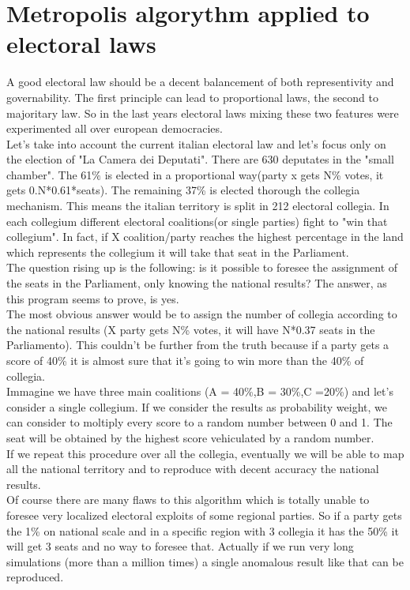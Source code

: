 \documentclass[12pt,a4paper,openright]{report}
\begin{document}
\chapter*{Metropolis algorythm applied to electoral laws}
A good electoral law should be a decent balancement of both representivity and governability. The first principle  can lead to proportional laws, the second to majoritary law. So in the last years electoral laws mixing these two features were experimented all over european democracies.\\
Let's take into account the current italian electoral law and let's focus only on the election of "La Camera dei Deputati". There are 630 deputates in the "small chamber". The 61$\% $ is elected in a proportional way(party x gets N\% votes, it gets 0.N*0.61*seats). The remaining 37\% is elected thorough the collegia mechanism. This means the italian territory is split in 212 electoral collegia. In each collegium different electoral coalitions(or single parties) fight to "win that collegium". In fact, if X coalition/party reaches the highest percentage in the land which represents the collegium it will take that seat in the Parliament.\\
The question rising up is the following: is it possible to foresee the assignment of the seats in the Parliament, only knowing the national results? The answer, as this program seems to prove, is yes.\\
The most obvious answer would be to assign the number of collegia according to the national results (X party gets N\% votes, it will have N*0.37 seats in the Parliamento). This couldn't be further from the truth because if a party gets a score of 40\% it is almost sure that it's going to win more than the 40\% of collegia.\\
Immagine we have three main coalitions (A = 40\%,B = 30\%,C =20\%) and let's consider a single collegium. If we consider the results as probability weight, we can consider to moltiply every score to a random number between 0 and 1. The seat will be obtained by the highest score vehiculated by a random number.\\
If we repeat this procedure over all the collegia, eventually we will be able to map all the national territory and to reproduce with decent accuracy the national results.\\
Of course there are many flaws to this algorithm which is totally unable to foresee very localized electoral exploits of some regional parties. So if a party gets the 1\% on national scale and in a specific region with 3 collegia it has the 50\% it will get 3 seats and no way to foresee that. Actually if we run very long simulations (more than a million times) a single anomalous result like that can be reproduced.\\
\end{document}
